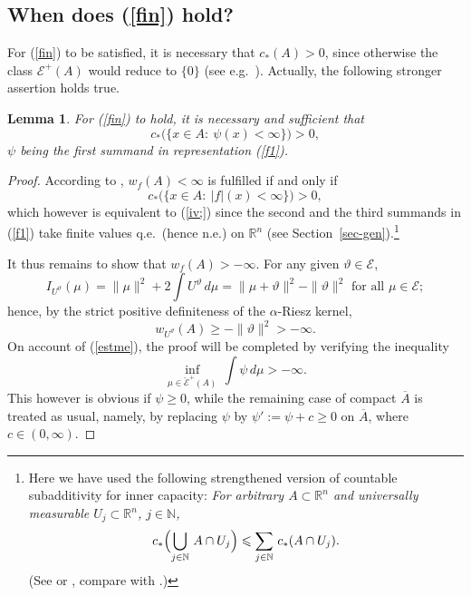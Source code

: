\documentclass[12pt,a4paper,reqno]{amsart} %
\theoremstyle{lause}
\theoremstyle{maaritelma}
\theoremstyle{lause}
\newtheorem{lemma}[theorem]{Lemma}
\theoremstyle{maaritelma}
\numberwithin{equation}{section}
\begin{document}
\subsection{When does (\ref{fin}) hold?} For (\ref{fin}) to be satisfied, it is necessary that $c_*(A)>0$, since otherwise the class $\mathcal E^+(A)$ would reduce to $\{0\}$ (see e.g.\ \cite[Lemma~2.3.1]{F1}). Actually, the following stronger assertion holds true.

\begin{lemma}\label{l-aux-3} For {\rm(\ref{fin})} to hold, it is necessary and sufficient that
\begin{equation}\label{iv;}
c_*\bigl(\{x\in A:\ \psi(x)<\infty\}\bigr)>0,
\end{equation}
$\psi$ being the first summand in representation {\rm(\ref{f1})}.
\end{lemma}

\begin{proof}
According to \cite[Lemma~5]{Z5a}, $w_f(A)<\infty$ is fulfilled if and only if
\[c_*\bigl(\{x\in A:\ |f|(x)<\infty\}\bigr)>0,\]
which however is equivalent to (\ref{iv;}) since the second and the third summands in (\ref{f1}) take finite values q.e.\ (hence n.e.) on $\mathbb R^n$ (see Section~\ref{sec-gen}).\footnote{Here we have used the following strengthened version of countable subadditivity for inner capacity: {\it For arbitrary $A\subset\mathbb R^n$ and universally measurable $U_j\subset\mathbb R^n$, $j\in\mathbb N$,
\[c_*\Bigl(\bigcup_{j\in\mathbb N}\,A\cap U_j\Bigr)\leqslant\sum_{j\in\mathbb N}\,c_*(A\cap U_j).\]} (See \cite[pp.~157--159]{F1} or \cite[p.~253]{Ca2}, compare with \cite[p.~144]{L}.)\label{foot-sub}}

It thus remains to show that $w_f(A)>-\infty$. For any given $\vartheta\in\mathcal E$,
\begin{equation*}\label{Isigma}
I_{U^\vartheta}(\mu)=\|\mu\|^2+2\int U^\vartheta\,d\mu=\|\mu+\vartheta\|^2-\|\vartheta\|^2\text{ \ for all $\mu\in\mathcal E$};
\end{equation*}
hence, by the strict positive definiteness of the $\alpha$-Riesz kernel,
\[w_{U^\vartheta}(A)\geqslant-\|\vartheta\|^2>-\infty.\]
On account of (\ref{estme}), the proof will be completed by verifying the inequality
\[\inf_{\mu\in\breve{\mathcal E}^+(A)}\,\int\psi\,d\mu>-\infty.\]
This however is obvious if $\psi\geqslant0$, while the remaining case of compact $\overline{A}$ is treated as usual, namely, by replacing $\psi$ by $\psi':=\psi+c\geqslant0$ on $\overline{A}$, where $c\in(0,\infty)$.
\end{proof}
\end{document}
